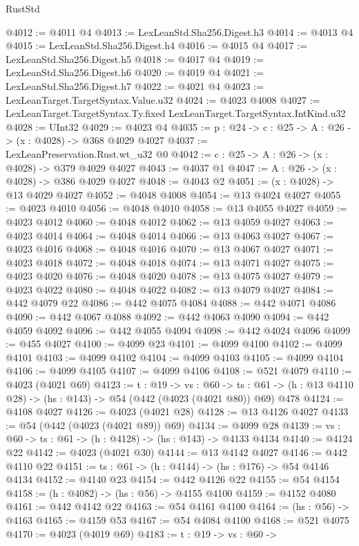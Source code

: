 \begin{lexlean}{RustStd}
\begin{coremodule}
@4012 := @4011 @4
@4013 := LexLeanStd.Sha256.Digest.h3
@4014 := @4013 @4
@4015 := LexLeanStd.Sha256.Digest.h4
@4016 := @4015 @4
@4017 := LexLeanStd.Sha256.Digest.h5
@4018 := @4017 @4
@4019 := LexLeanStd.Sha256.Digest.h6
@4020 := @4019 @4
@4021 := LexLeanStd.Sha256.Digest.h7
@4022 := @4021 @4
@4023 := LexLeanTarget.TargetSyntax.Value.u32
@4024 := @4023 @4008
@4027 := LexLeanTarget.TargetSyntax.Ty.fixed LexLeanTarget.TargetSyntax.IntKind.u32
@4028 := UInt32
@4029 := @4023 @4
@4035 := {p : @24} -> {c : @25} -> {A : @26} -> (x : @4028) -> @368 @4029 @4027
@4037 := LexLeanPreservation.Rust.wt_u32 @0
@4042 := {c : @25} -> {A : @26} -> (x : @4028) -> @379 @4029 @4027
@4043 := @4037 @1
@4047 := {A : @26} -> (x : @4028) -> @386 @4029 @4027
@4048 := @4043 @2
@4051 := (x : @4028) -> @13 @4029 @4027
@4052 := @4048 @4008
@4054 := @13 @4024 @4027
@4055 := @4023 @4010
@4056 := @4048 @4010
@4058 := @13 @4055 @4027
@4059 := @4023 @4012
@4060 := @4048 @4012
@4062 := @13 @4059 @4027
@4063 := @4023 @4014
@4064 := @4048 @4014
@4066 := @13 @4063 @4027
@4067 := @4023 @4016
@4068 := @4048 @4016
@4070 := @13 @4067 @4027
@4071 := @4023 @4018
@4072 := @4048 @4018
@4074 := @13 @4071 @4027
@4075 := @4023 @4020
@4076 := @4048 @4020
@4078 := @13 @4075 @4027
@4079 := @4023 @4022
@4080 := @4048 @4022
@4082 := @13 @4079 @4027
@4084 := @442 @4079 @22
@4086 := @442 @4075 @4084
@4088 := @442 @4071 @4086
@4090 := @442 @4067 @4088
@4092 := @442 @4063 @4090
@4094 := @442 @4059 @4092
@4096 := @442 @4055 @4094
@4098 := @442 @4024 @4096
@4099 := @455 @4027
@4100 := @4099 @23
@4101 := @4099 @4100
@4102 := @4099 @4101
@4103 := @4099 @4102
@4104 := @4099 @4103
@4105 := @4099 @4104
@4106 := @4099 @4105
@4107 := @4099 @4106
@4108 := @521 @4079
@4110 := @4023 (@4021 @69)
@4123 := {t : @19} ->
  {vs : @60} ->
  {ts : @61} -> (h : @13 @4110 @28) -> (hs : @143) -> @54 (@442 (@4023 (@4021 @80)) @69) @478
@4124 := @4108 @4027
@4126 := @4023 (@4021 @28)
@4128 := @13 @4126 @4027
@4133 := @54 (@442 (@4023 (@4021 @89)) @69)
@4134 := @4099 @28
@4139 := {vs : @60} -> {ts : @61} -> (h : @4128) -> (hs : @143) -> @4133 @4134
@4140 := @4124 @22
@4142 := @4023 (@4021 @30)
@4144 := @13 @4142 @4027
@4146 := @442 @4110 @22
@4151 := {ts : @61} -> (h : @4144) -> (hs : @176) -> @54 @4146 @4134
@4152 := @4140 @23
@4154 := @442 @4126 @22
@4155 := @54 @4154
@4158 := (h : @4082) -> (hs : @56) -> @4155 @4100
@4159 := @4152 @4080
@4161 := @442 @4142 @22
@4163 := @54 @4161 @4100
@4164 := (hs : @56) -> @4163
@4165 := @4159 @53
@4167 := @54 @4084 @4100
@4168 := @521 @4075
@4170 := @4023 (@4019 @69)
@4183 := {t : @19} ->
  {vs : @60} ->

\end{coremodule}
\end{lexlean}
